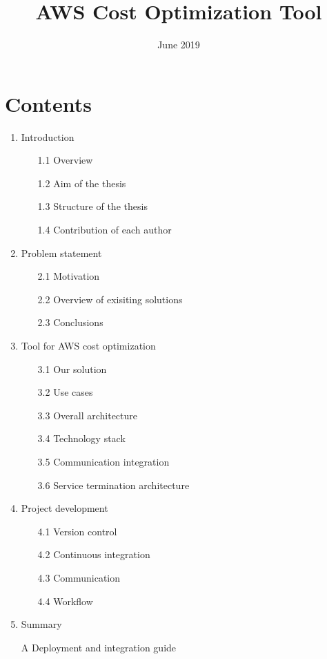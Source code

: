\documentclass[licencjacka,en]{thesisclass}
\title{AWS Cost Optimization Tool}
\date{June 2019}
\begin{document}
    \maketitle

    \begin{abstract}
        
    \end{abstract}

    \chapter*{Contents}

    \begin{enumerate}
        \item Introduction
        \begin{enumerate}
            \item [1.1] Overview
            \item [1.2] Aim of the thesis
            \item [1.3] Structure of the thesis
            \item [1.4] Contribution of each author
        \end{enumerate}
        \item Problem statement
        \begin{enumerate}
            \item [2.1] Motivation
            \item [2.2] Overview of exisiting solutions
            \item [2.3] Conclusions
        \end{enumerate}
        \item Tool for AWS cost optimization
        \begin{enumerate}
            \item [3.1] Our solution
            \item [3.2] Use cases
            \item [3.3] Overall architecture
            \item [3.4] Technology stack
            \item [3.5] Communication integration
            \item [3.6] Service termination architecture
        \end{enumerate}
        \item Project development
        \begin{enumerate}
            \item [4.1] Version control
            \item [4.2] Continuous integration
            \item [4.3] Communication
            \item [4.4] Workflow
        \end{enumerate}
        \item Summary
        \item [A] Deployment and integration guide
    \end{enumerate}
\end{document}
